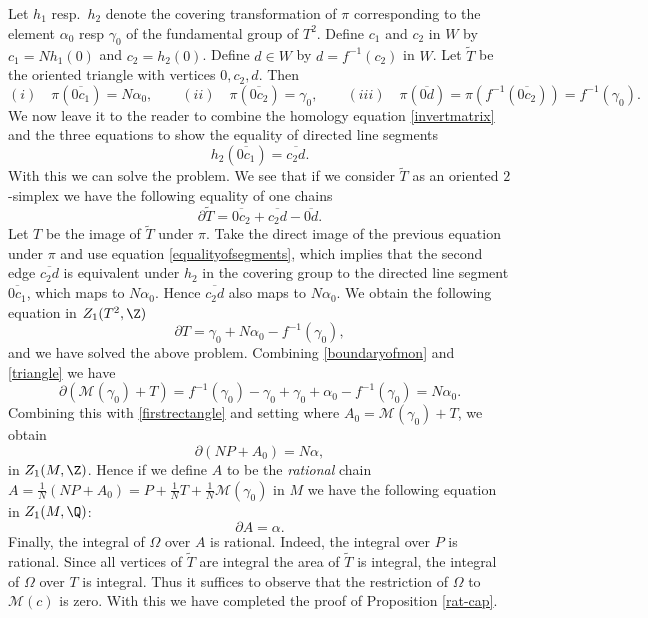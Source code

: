 Let $h_1$ resp.\ $h_2$ denote the covering transformation of $\pi$
corresponding to the element $\alpha_0$ resp $\gamma_0$ of the
fundamental group of $T^2$. Define $c_1$ and $c_2$ in $W$ by $c_1
= Nh_1(0)$ and $c_2=h_2(0)$. Define $d \in W$ by $d =f^{-1}(c_2)$
in $W$. Let $\widetilde{T}$ be the oriented triangle
with vertices $0,c_2,d$.  Then
\begin{equation*}
 (i) \quad \pi(\overline{0c_1}) =N\alpha_0, \qquad
 (ii) \quad \pi(\overline{0c_2})= \gamma_0, \qquad
 (iii) \quad \pi(\overline{0d}) = \pi(f^{-1}(\overline{0c_2})) = f^{-1}(\gamma_0).
\end{equation*}
We now leave it to the reader to combine the homology equation
\eqref{invertmatrix} and the three equations to show the equality
of directed line segments
\begin{equation}\label{equalityofsegments}
h_2( \overline{0c_1}) = \overline{c_2d}.
\end{equation}
With this we can solve the problem. 
We see that if we consider $\widetilde{T}$ as an oriented $2$-simplex
we have the following equality of one chains
\begin{equation*}
\partial \widetilde{T} = \overline{0c_2} + \overline{c_2d} - \overline{0d}.
\end{equation*}
Let $T$ be the image of $\widetilde{T}$ under $\pi$. Take
the direct image of the previous equation under $\pi$ and use
equation \eqref{equalityofsegments}, which implies that the second
edge $\overline{c_2d}$ is equivalent under $h_2$ in the covering
group to the directed line segment $\overline{0c_1}$, which maps to
$N\alpha_0$. Hence $\overline{c_2d}$ also maps to $N\alpha_0$. We
obtain  the following equation in $Z_1(T^2,\Z)$
\begin{equation}\label{triangle}
\partial T =  \gamma_0 + N \alpha_0 - f^{-1}(\gamma_0),
\end{equation}
and we have solved the above problem. Combining \eqref{boundaryofmon}
and \eqref{triangle} we have
\begin{equation*}
\partial (\mathcal{M}(\gamma_0) + T ) = f^{-1}(\gamma_0) -\gamma_0 +\gamma_0 + \alpha_0 - f^{-1}(\gamma_0)= N\alpha_0.
\end{equation*}
Combining this with \eqref{firstrectangle} and setting where $A_0 =
\mathcal{M}(\gamma_0) +T$, we obtain
\begin{equation} \label{cap}
\partial (NP + A_0 ) = N \alpha,
\end{equation}
in $Z_1(M,\Z)$. Hence if we define $A$ to be the  \emph{rational}
chain $A = \frac{1}{N} (NP + A_0) = P + \frac{1}{N}T + \frac{1}{N}
\mathcal{M}(\gamma_0)$ in $M$ we have the following equation in
$Z_1(M,\Q)$:
\begin{equation*}
\partial A = \alpha.
\end{equation*}
Finally, the integral of $\Omega$ over $A$ is rational. Indeed, the
integral over $P$ is rational.  Since all vertices of $\widetilde{T}$
are integral the area of $\widetilde{T}$ is integral, the integral
of $\Omega$ over $T$ is integral. Thus it suffices to observe that
the restriction of $\Omega$ to $\mathcal{M}(c)$ is zero. With this
we have completed the proof of Proposition \ref{rat-cap}.

